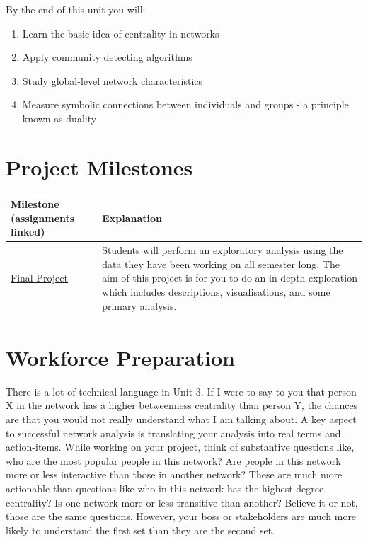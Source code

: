 \documentclass[
  letterpaper,
  DIV=11,
  numbers=noendperiod]{scrreprt}
\begin{document}
By the end of this unit you will:

\begin{enumerate}
\def\labelenumi{\arabic{enumi}.}
\item
  Learn the basic idea of centrality in networks
\item
  Apply community detecting algorithms
\item
  Study global-level network characteristics
\item
  Measure symbolic connections between individuals and groups - a
  principle known as duality
\end{enumerate}

\section{Project Milestones}\label{project-milestones-2}

\begin{longtable}[]{@{}
  >{\raggedright\arraybackslash}p{}
  >{\raggedright\arraybackslash}p{}@{}}
\toprule\noalign{}
\begin{minipage}[b]{\linewidth}\raggedright
Milestone (assignments linked)
\end{minipage} & \begin{minipage}[b]{\linewidth}\raggedright
Explanation
\end{minipage} \\
\midrule\noalign{}
\endhead
\bottomrule\noalign{}
\endlastfoot
\href{Final\%20Project\%20Instructions.qmd}{Final Project} & Students
will perform an exploratory analysis using the data they have been
working on all semester long. The aim of this project is for you to do
an in-depth exploration which includes descriptions, visualisations, and
some primary analysis. ~ \\
\end{longtable}

\section{Workforce Preparation}\label{workforce-preparation-2}

There is a lot of technical language in Unit 3. If I were to say to you
that person X in the network has a higher betweenness centrality than
person Y, the chances are that you would not really understand what I am
talking about. A key aspect to successful network analysis is
translating your analysis into real terms and action-items. While
working on your project, think of substantive questions like, who are
the most popular people in this network? Are people in this network more
or less interactive than those in another network? These are much more
actionable than questions like who in this network has the highest
degree centrality? Is one network more or less transitive than another?
Believe it or not, those are the same questions. However, your boss or
stakeholders are much more likely to understand the first set than they
are the second set.
\end{document}
